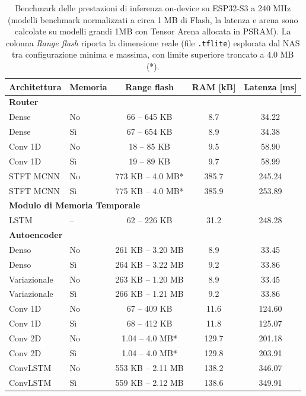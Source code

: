 \begin{table}[H]
	\centering
	\begin{tabular}{llccc}
		\toprule
		\textbf{Architettura} & \textbf{Memoria} & \textbf{Range flash} & \textbf{RAM [kB]} & \textbf{Latenza [ms]} \\
		\midrule
		\multicolumn{5}{l}{\textbf{Router}} \\
		Dense             & No  & 66 -- 645 KB         & 8.7   & 34.22 \\
		Dense             & Sì  & 67 -- 654 KB         & 8.9   & 34.38 \\
		Conv 1D           & No  & 18 -- 85 KB          & 9.5   & 58.90 \\
		Conv 1D           & Sì  & 19 -- 89 KB          & 9.7   & 58.99 \\
		STFT MCNN         & No  & 773 KB -- 4.0 MB*    & 385.7 & 245.24 \\
		STFT MCNN         & Sì  & 775 KB -- 4.0 MB*    & 385.9 & 253.89 \\
		\midrule
		\multicolumn{5}{l}{\textbf{Modulo di Memoria Temporale}} \\
		LSTM                    & --  & 62 -- 226 KB         & 31.2  & 248.28 \\
		\midrule
		\multicolumn{5}{l}{\textbf{Autoencoder}} \\
		Denso             & No  & 261 KB -- 3.20 MB    & 8.9   & 33.45 \\
		Denso            & Sì  & 264 KB -- 3.22 MB    & 9.2   & 33.86 \\
		Variazionale      & No  & 263 KB -- 1.20 MB    & 8.9   & 33.45 \\
		Variazionale     & Sì  & 266 KB -- 1.21 MB    & 9.2   & 33.86 \\
		Conv 1D    & No  & 67 -- 409 KB         & 11.6  & 124.60 \\
		Conv 1D       & Sì  & 68 -- 412 KB         & 11.8  & 125.07 \\
		Conv 2D        & No  & 1.04 -- 4.0 MB*      & 129.7 & 201.18 \\
		Conv 2D       & Sì  & 1.04 -- 4.0 MB*      & 129.8 & 203.91 \\
		ConvLSTM       & No  & 553 KB -- 2.11 MB    & 138.2 & 346.07 \\
		ConvLSTM         & Sì  & 559 KB -- 2.12 MB    & 138.6 & 349.91 \\
		\bottomrule
	\end{tabular}
	\caption{Benchmark delle prestazioni di inferenza on-device su ESP32-S3 a 240 MHz (modelli benchmark normalizzati a circa 1 MB di Flash, la latenza e arena sono calcolate su modelli grandi 1MB con Tensor Arena allocata in PSRAM). La colonna \emph{Range flash} riporta la dimensione reale (file \texttt{.tflite}) esplorata dal NAS tra configurazione minima e massima, con limite superiore troncato a 4.0 MB (*).}
	\label{tab:esp32_hardware_benchmark}
\end{table}

